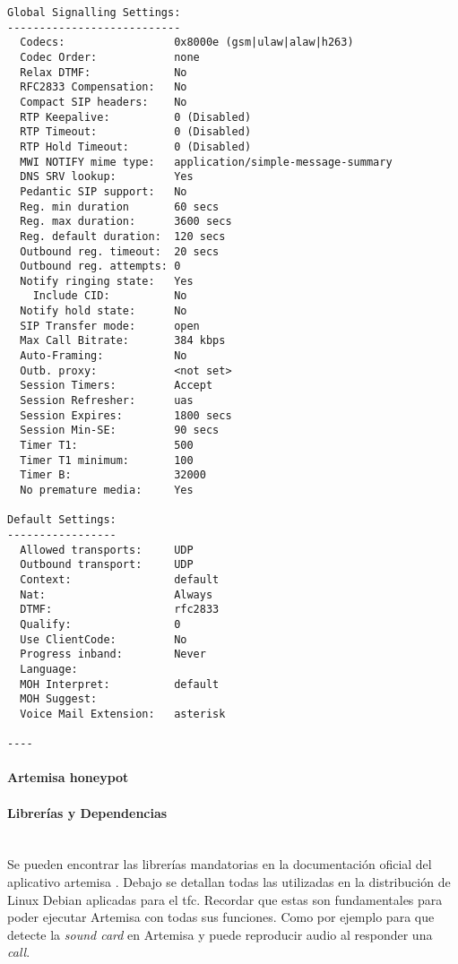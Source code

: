 \documentclass[a4paper,12pt]{report}
\newenvironment{myscriptlisting}
{\begin{list}{}{\setlength{\leftmargin}{1em}}\item\scriptsize\bfseries}
{\end{list}}
\begin{document}
\begin{myscriptlisting}
\begin{verbatim}
Global Signalling Settings:
---------------------------
  Codecs:                 0x8000e (gsm|ulaw|alaw|h263)
  Codec Order:            none
  Relax DTMF:             No
  RFC2833 Compensation:   No
  Compact SIP headers:    No
  RTP Keepalive:          0 (Disabled)
  RTP Timeout:            0 (Disabled)
  RTP Hold Timeout:       0 (Disabled)
  MWI NOTIFY mime type:   application/simple-message-summary
  DNS SRV lookup:         Yes
  Pedantic SIP support:   No
  Reg. min duration       60 secs
  Reg. max duration:      3600 secs
  Reg. default duration:  120 secs
  Outbound reg. timeout:  20 secs
  Outbound reg. attempts: 0
  Notify ringing state:   Yes
    Include CID:          No
  Notify hold state:      No
  SIP Transfer mode:      open
  Max Call Bitrate:       384 kbps
  Auto-Framing:           No
  Outb. proxy:            <not set> 
  Session Timers:         Accept
  Session Refresher:      uas
  Session Expires:        1800 secs
  Session Min-SE:         90 secs
  Timer T1:               500
  Timer T1 minimum:       100
  Timer B:                32000
  No premature media:     Yes

Default Settings:
-----------------
  Allowed transports:     UDP
  Outbound transport:	  UDP
  Context:                default
  Nat:                    Always
  DTMF:                   rfc2833
  Qualify:                0
  Use ClientCode:         No
  Progress inband:        Never
  Language:               
  MOH Interpret:          default
  MOH Suggest:            
  Voice Mail Extension:   asterisk

----

\end{verbatim}
\end{myscriptlisting}

\newpage

\paragraph{Artemisa honeypot}
\paragraph{Librerías y Dependencias\\ \\}

Se pueden encontrar las librerías mandatorias en la documentación oficial del aplicativo artemisa \cite{docarmom}.
Debajo se detallan todas las utilizadas en la distribución de Linux Debian aplicadas para el \ac{tfc}.
Recordar que estas son fundamentales para poder ejecutar Artemisa con todas sus funciones. Como por 
ejemplo para que detecte la \emph{sound card} en Artemisa y puede reproducir audio al responder una 
\emph{call}.
\end{document}
